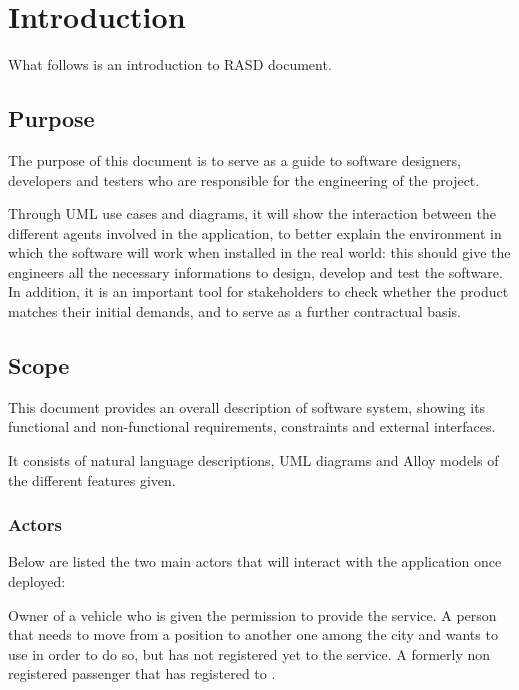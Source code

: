 \section{Introduction}	%
What follows is an introduction to \myTaxiService{} RASD document.
\subsection{Purpose}
The purpose of this document is to serve as a guide to software designers, developers and testers who are responsible for the engineering of the \myTaxiService{} project.\par
Through UML use cases and diagrams, it will show the interaction between the different agents involved in the application, to better explain the environment in which the software will work when installed in the real world: this should give the engineers all the necessary informations to design, develop and test the software.
In addition, it is an important tool for stakeholders to check whether the product matches their initial demands, and to serve as a further contractual basis.
\subsection{Scope}
This document provides an overall description of \myTaxiService{} software system, showing its functional and non-functional requirements, constraints and external interfaces.\par
It consists of natural language descriptions, UML diagrams and Alloy models of the different features given.
\subsubsection{Actors}
Below are listed the two main actors that will interact with the application once deployed:
\begin{itemize}
		Owner of a vehicle who is given the permission to provide the service.
	 A person that needs to move from a position to another one among the city and wants to use \myTaxiService{} in order to do so, but has not registered yet to the service.
	 A formerly non registered passenger that has registered to \myTaxiService{}.
\end{itemize}
